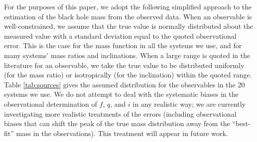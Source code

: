 \documentclass[preprint]{aastex}
\begin{document}
For the purposes of this paper, we adopt the following simplified
approach to the estimation of the black hole mass from the observed
data.  When an observable is well-constrained, we assume that the true
value is normally distributed about the measured value with a standard
deviation equal to the quoted observational error.  This is the case
for the mass function in all the systems we use, and for many systems'
mass ratios and inclinations.  When a large range is quoted in the
literature for an observable, we take the true value to be distributed
uniformly (for the mass ratio) or isotropically (for the inclination)
within the quoted range.  Table \ref{tab:sources} gives the assumed
distribution for the observables in the 20 systems we use.  We do not
attempt to deal with the systematic biases in the observational
determination of $f$, $q$, and $i$ in any realistic way; we are
currently investigating more realistic treatments of the errors
(including observational biases that can shift the peak of the true
mass distribution away from the ``best-fit'' mass in the
observations).  This treatment will appear in future work.
\end{document}
